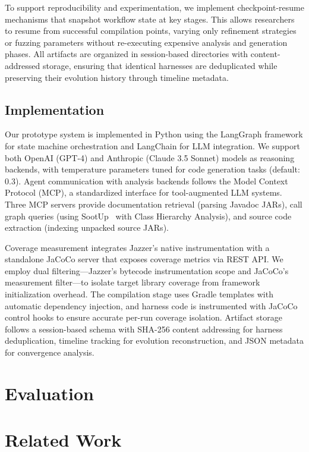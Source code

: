 \documentclass[sigconf,review,anonymous]{acmart}
\begin{document}
To support reproducibility and experimentation, we implement checkpoint-resume mechanisms that snapshot workflow state at key stages. This allows researchers to resume from successful compilation points, varying only refinement strategies or fuzzing parameters without re-executing expensive analysis and generation phases. All artifacts are organized in session-based directories with content-addressed storage, ensuring that identical harnesses are deduplicated while preserving their evolution history through timeline metadata.

\subsection{Implementation}

Our prototype system is implemented in Python using the LangGraph framework for state machine orchestration and LangChain for LLM integration. We support both OpenAI (GPT-4) and Anthropic (Claude 3.5 Sonnet) models as reasoning backends, with temperature parameters tuned for code generation tasks (default: 0.3). Agent communication with analysis backends follows the Model Context Protocol (MCP), a standardized interface for tool-augmented LLM systems. Three MCP servers provide documentation retrieval (parsing Javadoc JARs), call graph queries (using SootUp~\cite{DBLP:conf/icse/SchottKB25:SootUp} with Class Hierarchy Analysis), and source code extraction (indexing unpacked source JARs).

Coverage measurement integrates Jazzer's native instrumentation with a standalone JaCoCo server that exposes coverage metrics via REST API. We employ dual filtering—Jazzer's bytecode instrumentation scope and JaCoCo's measurement filter—to isolate target library coverage from framework initialization overhead. The compilation stage uses Gradle templates with automatic dependency injection, and harness code is instrumented with JaCoCo control hooks to ensure accurate per-run coverage isolation. Artifact storage follows a session-based schema with SHA-256 content addressing for harness deduplication, timeline tracking for evolution reconstruction, and JSON metadata for convergence analysis.


\section{Evaluation}





\section{Related Work}
\label{sec:related-work}
\end{document}

